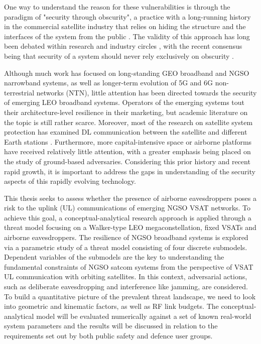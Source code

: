 \documentclass[english, 12pt, a4paper, elec, utf8, a-1b, online]{aaltothesis}
\begin{document}
One way to understand the reason for these vulnerabilities is through the paradigm of "security through obscurity", a practice with a long-running history in the commercial satellite industry that relies on hiding the structure and the interfaces of the system from the public \cite{lin2022defending}.
The validity of this approach has long been debated within research and industry circles \cite{johansson2008great}, with the recent consensus being that security of a system should never rely exclusively on obscurity \cite{diehl2016law, guo2018defending}.

Although much work has focused on long-standing GEO broadband and NGSO narrowband systems, as well as longer-term evolution of 5G and 6G non-terrestrial networks (NTN), little attention has been directed towards the security of emerging LEO broadband systems.
Operators of the emerging systems tout their architecture-level resilience in their marketing, but academic literature on the topic is still rather scarce.
Moreover, most of the research on satellite system protection has examined DL communication between the satellite and different Earth stations \cite{abdelsalam2023physical}.
Furthermore, more capital-intensive space or airborne platforms have received relatively little attention, with a greater emphasis being placed on the study of ground-based adversaries.
Considering this prior history and recent rapid growth, it is important to address the gaps in understanding of the security aspects of this rapidly evolving technology. 

This thesis seeks to assess whether the presence of airborne eavesdroppers poses a risk to the uplink (UL) communications of emerging NGSO VSAT networks. %
To achieve this goal, a conceptual-analytical research approach is applied through a threat model focusing on a Walker-type LEO megaconstellation, fixed VSATs and airborne eavesdroppers.
The resilience of NGSO broadband systems is explored via a parametric study of a threat model consisting of four discrete submodels.
Dependent variables of the submodels are the key to understanding the fundamental constraints of NGSO satcom systems from the perspective of VSAT UL communication with orbiting satellites.
In this context, adversarial actions, such as deliberate eavesdropping and interference like jamming, are considered.
To build a quantitative picture of the prevalent threat landscape, we need to look into geometric and kinematic factors, as well as RF link budgets. 
The conceptual-analytical model will be evaluated numerically against a set of known real-world system parameters and the results will be discussed in relation to the requirements set out by both public safety and defence user groups.
\end{document}
